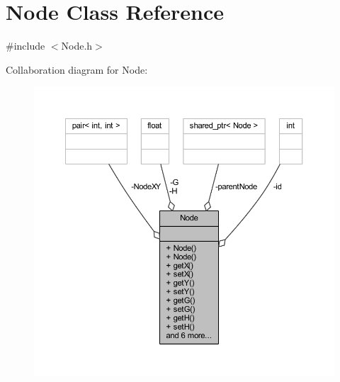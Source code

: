 \hypertarget{class_node}{}\section{Node Class Reference}
\label{class_node}


{\ttfamily \#include $<$Node.\+h$>$}



Collaboration diagram for Node\+:\nopagebreak
\begin{figure}[H]
\begin{center}
\leavevmode
\includegraphics[width=350pt]{class_node__coll__graph}
\end{center}
\end{figure}
